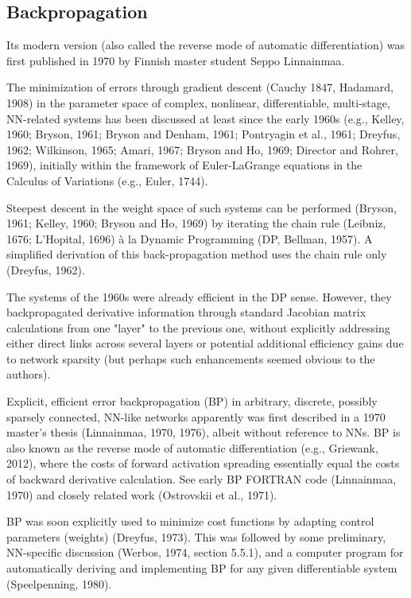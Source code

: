 \documentclass[a4paper,12pt]{report}
\begin{document}
\subsection{Backpropagation}
Its modern version (also called the reverse mode of automatic differentiation) was first published in 1970 by Finnish master student Seppo Linnainmaa.

The minimization of errors through gradient descent (Cauchy 1847, Hadamard, 1908) in the parameter space of complex, nonlinear, differentiable, multi-stage, NN-related systems has been discussed at least since the early 1960s (e.g., Kelley, 1960; Bryson, 1961; Bryson and Denham, 1961; Pontryagin et al., 1961; Dreyfus, 1962; Wilkinson, 1965; Amari, 1967; Bryson and Ho, 1969; Director and Rohrer, 1969), initially within the framework of Euler-LaGrange equations in the Calculus of Variations (e.g., Euler, 1744).

Steepest descent in the weight space of such systems can be performed (Bryson, 1961; Kelley, 1960; Bryson and Ho, 1969) by iterating the chain rule (Leibniz, 1676; L'Hopital, 1696) à la Dynamic Programming (DP, Bellman, 1957). A simplified derivation of this back-propagation method uses the chain rule only (Dreyfus, 1962).

The systems of the 1960s were already efficient in the DP sense. However, they backpropagated derivative information through standard Jacobian matrix calculations from one "layer" to the previous one, without explicitly addressing either direct links across several layers or potential additional efficiency gains due to network sparsity (but perhaps such enhancements seemed obvious to the authors).

Explicit, efficient error backpropagation (BP) in arbitrary, discrete, possibly sparsely connected, NN-like networks apparently was first described in a 1970 master's thesis (Linnainmaa, 1970, 1976), albeit without reference to NNs. BP is also known as the reverse mode of automatic differentiation (e.g., Griewank, 2012), where the costs of forward activation spreading essentially equal the costs of backward derivative calculation. See early BP FORTRAN code (Linnainmaa, 1970) and closely related work (Ostrovskii et al., 1971).

BP was soon explicitly used to minimize cost functions by adapting control parameters (weights) (Dreyfus, 1973). This was followed by some preliminary, NN-specific discussion (Werbos, 1974, section 5.5.1), and a computer program for automatically deriving and implementing BP for any given differentiable system (Speelpenning, 1980).
\end{document}
